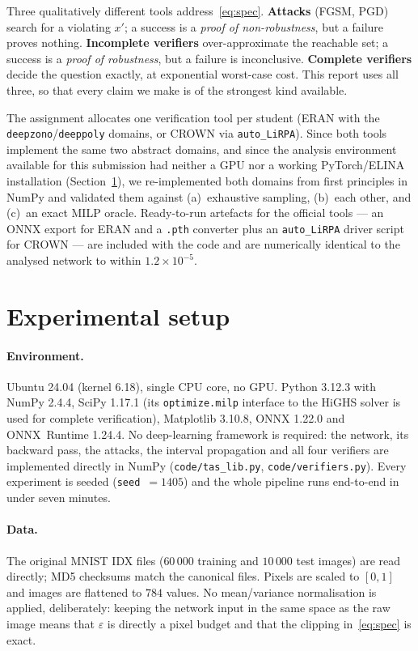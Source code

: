 \documentclass[11pt,a4paper]{article}
\newcommand{\eps}{\varepsilon}
\begin{document}
Three qualitatively different tools address~\eqref{eq:spec}. \textbf{Attacks}
(FGSM, PGD) search for a violating $x'$; a success is a \emph{proof of
non-robustness}, but a failure proves nothing. \textbf{Incomplete verifiers}
over-approximate the reachable set; a success is a \emph{proof of robustness},
but a failure is inconclusive. \textbf{Complete verifiers} decide the question
exactly, at exponential worst-case cost. This report uses all three, so that
every claim we make is of the strongest kind available.

The assignment allocates one verification tool per student (ERAN with the
\texttt{deepzono}/\texttt{deeppoly} domains, or CROWN via \texttt{auto\_LiRPA}).
Since both tools implement the same two abstract domains, and since the analysis
environment available for this submission had neither a GPU nor a working
PyTorch/ELINA installation (Section~\ref{sec:env}), we re-implemented both
domains from first principles in NumPy and validated them against
(a)~exhaustive sampling, (b)~each other, and (c)~an exact MILP oracle. Ready-to-run
artefacts for the official tools --- an ONNX export for ERAN and a
\texttt{.pth} converter plus an \texttt{auto\_LiRPA} driver script for CROWN ---
are included with the code and are numerically identical to the analysed
network to within $1.2\times10^{-5}$.

\section{Experimental setup}
\label{sec:env}

\paragraph{Environment.} Ubuntu 24.04 (kernel 6.18), single CPU core, no GPU.
Python 3.12.3 with NumPy 2.4.4, SciPy 1.17.1 (its \texttt{optimize.milp}
interface to the HiGHS solver is used for complete verification), Matplotlib
3.10.8, ONNX 1.22.0 and ONNX~Runtime 1.24.4. No deep-learning framework is
required: the network, its backward pass, the attacks, the interval propagation
and all four verifiers are implemented directly in NumPy
(\texttt{code/tas\_lib.py}, \texttt{code/verifiers.py}). Every experiment is
seeded (\texttt{seed}~$=1405$) and the whole pipeline runs end-to-end in under
seven minutes.

\paragraph{Data.} The original MNIST IDX files ($60\,000$ training and
$10\,000$ test images) are read directly; MD5 checksums match the canonical
files. Pixels are scaled to $[0,1]$ and images are flattened to $784$ values.
No mean/variance normalisation is applied, deliberately: keeping the network
input in the same space as the raw image means that $\eps$ is directly a pixel
budget and that the clipping in~\eqref{eq:spec} is exact.
\end{document}
